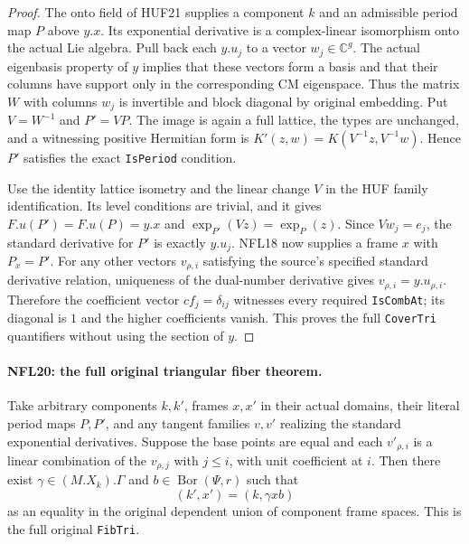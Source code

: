 \begin{proof}
The onto field of HUF21 supplies a component $k$ and an admissible
period map $P$ above $y.x$.  Its exponential derivative is a
complex-linear isomorphism onto the actual Lie algebra.
Pull back each $y.u_j$ to a vector $w_j\in\mathbb C^g$.
The actual eigenbasis property of $y$ implies that these vectors
form a basis and that their columns have support only in the
corresponding CM eigenspace.  Thus the matrix $W$ with columns
$w_j$ is invertible and block diagonal by original embedding.
Put $V=W^{-1}$ and $P'=VP$.  The image is again a full lattice,
the types are unchanged, and a witnessing positive Hermitian
form is $K'(z,w)=K(V^{-1}z,V^{-1}w)$.  Hence $P'$ satisfies
the exact \texttt{IsPeriod} condition.

Use the identity lattice isometry and the linear change $V$ in
the HUF family identification.  Its level conditions are
trivial, and it gives
$F.u(P')=F.u(P)=y.x$ and $\exp_{P'}(Vz)=\exp_P(z)$.
Since $Vw_j=e_j$, the standard derivative for $P'$ is exactly
$y.u_j$.  NFL18 now supplies a frame $x$ with $P_x=P'$.
For any other vectors $v_{\rho,i}$ satisfying the source's
specified standard derivative relation, uniqueness of the
dual-number derivative gives $v_{\rho,i}=y.u_{\rho,i}$.
Therefore the coefficient vector $cf_j=\delta_{ij}$ witnesses
every required \texttt{IsCombAt}; its diagonal is $1$ and
the higher coefficients vanish.  This proves the full
\texttt{CoverTri} quantifiers without using the section of $y$.
\end{proof}

\paragraph{NFL20: the full original triangular fiber theorem.}
\label{claim:NFL20}
Take arbitrary components $k,k'$, frames $x,x'$ in their actual
domains, their literal period maps $P,P'$, and any tangent
families $v,v'$ realizing the standard exponential derivatives.
Suppose the base points are equal and each $v'_{\rho,i}$ is a
linear combination of the $v_{\rho,j}$ with $j\le i$, with
unit coefficient at $i$.  Then there exist
$\gamma\in(M.X_k).\Gamma$ and $b\in\operatorname{Bor}(\Psi,r)$
such that
\[
 (k',x')=(k,\gamma x b)
 \tag{NFL.27}
\]
as an equality in the original dependent union of component
frame spaces.  This is the full original \texttt{FibTri}.

